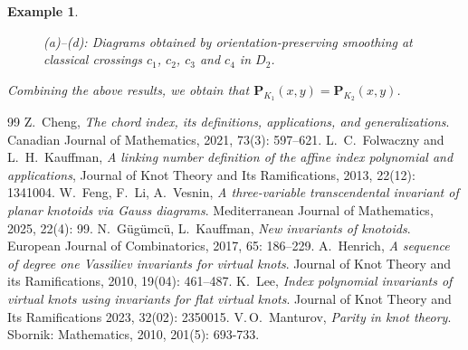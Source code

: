 \documentclass[10pt,a4paper]{amsart}
\newtheorem{example}{Example}[section]
\numberwithin{equation}{section}
\numberwithin{equation}{section}
\begin{document}
\begin{example}
{\begin{figure}[!ht]
			\caption{(a)--(d): Diagrams obtained by orientation-preserving smoothing at classical crossings $c_1$, $c_2$, $c_3$ and $c_4$ in $D_2$.} \label{fig517}
		\end{figure}
		Combining the above results, we obtain that $\mathbf{P}_{K_1}(x,y)= \mathbf{P}_{K_2}(x,y)$. 
	}
\end{example}

\begin{thebibliography}{99}
 Z.~Cheng, \textit{The chord index, its definitions, applications, and generalizations}. Canadian Journal of Mathematics, 2021, 73(3): 597--621.
 L.~C.~Folwaczny and L.~H.~Kauffman, \textit{A linking number definition of the affine index polynomial and applications}, Journal of Knot Theory and Its Ramifications, 2013, 22(12): 1341004.
 W.~Feng, F.~Li, A.~Vesnin, \textit{A three-variable transcendental invariant of planar knotoids via Gauss diagrams}. Mediterranean Journal of Mathematics, 2025, 22(4): 99.
 N.~G\"{u}g\"{u}mc\"{u}, L.~Kauffman, \textit{New invariants of knotoids}. European Journal of Combinatorics, 2017, 65: 186--229.
 A.~Henrich, \textit{A sequence of degree one Vassiliev invariants for virtual knots}. Journal of Knot Theory and its Ramifications, 2010, 19(04): 461--487.
 K.~Lee, \textit{Index polynomial invariants of virtual knots using invariants for flat virtual knots}. Journal of Knot Theory and Its Ramifications 2023, 32(02): 2350015.
 V.\,O.~Manturov, \textit{Parity in knot theory}. Sbornik: Mathematics, 2010, 201(5): 693-733.
\end{thebibliography}
\end{document}
